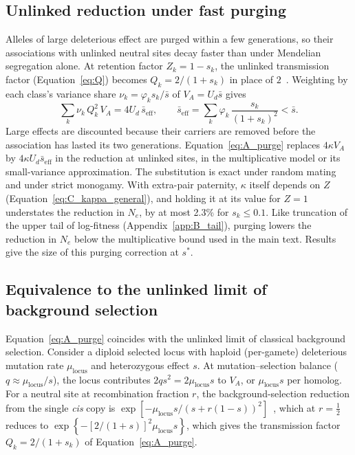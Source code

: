 \documentclass{article}
\begin{document}
\subsection{Unlinked reduction under fast purging}\label{app:A_purge}
Alleles of large deleterious effect are purged within a few generations, so their associations with unlinked neutral sites decay faster than under Mendelian segregation alone. At retention factor $Z_k = 1 - s_k$, the unlinked transmission factor (Equation~\eqref{eq:Q}) becomes $Q_k = 2/(1 + s_k)$ in place of $2$~\cite{santiago1998,charlesworth2012}. Weighting by each class's variance share $\nu_k = \varphi_k s_k / \bar{s}$ of $V_A = U_d\bar{s}$ gives
\begin{equation}
    \sum_k \nu_k\,Q_k^2\,V_A = 4U_d\,\bar{s}_\text{eff}, \qquad \bar{s}_\text{eff} = \sum_k \varphi_k\,\frac{s_k}{(1+s_k)^2} < \bar{s}.
\label{eq:A_purge}
\end{equation}
Large effects are discounted because their carriers are removed before the association has lasted its two generations. Equation~\eqref{eq:A_purge} replaces $4\kappa V_A$ by $4\kappa U_d\bar{s}_\text{eff}$ in the reduction at unlinked sites, in the multiplicative model or its small-variance approximation. The substitution is exact under random mating and under strict monogamy. With extra-pair paternity, $\kappa$ itself depends on $Z$ (Equation~\eqref{eq:C_kappa_general}), and holding it at its value for $Z = 1$ understates the reduction in $N_e$, by at most 2.3\% for $s_k \le 0.1$. Like truncation of the upper tail of log-fitness (Appendix~\ref{app:B_tail}), purging lowers the reduction in $N_e$ below the multiplicative bound used in the main text. Results give the size of this purging correction at $s^*$.

\subsection{Equivalence to the unlinked limit of background selection}\label{app:A_bgs}
Equation~\eqref{eq:A_purge} coincides with the unlinked limit of classical background selection. Consider a diploid selected locus with haploid (per-gamete) deleterious mutation rate $\mu_\text{locus}$ and heterozygous effect $s$. At mutation--selection balance ($q \approx \mu_\text{locus}/s$), the locus contributes $2qs^2 = 2\mu_\text{locus}s$ to $V_A$, or $\mu_\text{locus}s$ per homolog. For a neutral site at recombination fraction $r$, the background-selection reduction from the single \textit{cis} copy is $\exp\left[-\mu_\text{locus}s / (s + r(1-s))^2\right]$~\cite{hudson1995,nordborg1996}, which at $r = \tfrac12$ reduces to $\exp\left\{-[2/(1+s)]^2\mu_\text{locus}s\right\}$, which gives the transmission factor $Q_k = 2/(1+s_k)$ of Equation~\eqref{eq:A_purge}.
\end{document}
